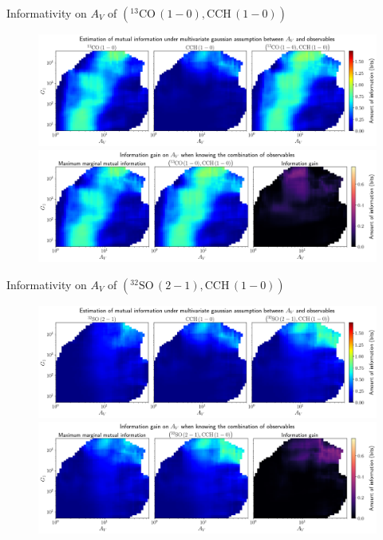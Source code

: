 \documentclass{beamer}
\begin{document}
\begin{frame}{Informativity on $A_V$ of $\left(\mathrm{^{13}CO\,(1-0)},\mathrm{CCH\,(1-0)}\right)$}
    \begin{figure}
        \centering
        \includegraphics[width=0.95\linewidth]{../linearinfogauss/av__13co10_cch10_linearinfogauss.png}
        \vfill
        \includegraphics[width=0.95\linewidth]{../linearinfogauss/av__13co10_cch10_linearinfogauss_gain.png}
    \end{figure}
\end{frame}

\begin{frame}{Informativity on $A_V$ of $\left(\mathrm{^{32}SO\,(2-1)},\mathrm{CCH\,(1-0)}\right)$}
    \begin{figure}
        \centering
        \includegraphics[width=0.95\linewidth]{../linearinfogauss/av__32so21_cch10_linearinfogauss.png}
        \vfill
        \includegraphics[width=0.95\linewidth]{../linearinfogauss/av__32so21_cch10_linearinfogauss_gain.png}
    \end{figure}
\end{frame}
\end{document}
